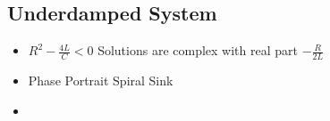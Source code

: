 \documentclass[preview]{standalone}
\begin{document}
\begin{center}
\subsection*{Underdamped System}
                    \begin{itemize}
                        \item $R^2 - \frac{4L}{C} < 0$ \rightarrow Solutions are complex with real part $-\frac{R}{2L}$
                        \item Phase Portrait \rightarrow Spiral Sink
                        \item 
                    \end{itemize}
\end{center}
\end{document}
